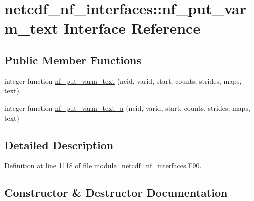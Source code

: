 \hypertarget{interfacenetcdf__nf__interfaces_1_1nf__put__varm__text}{}\section{netcdf\+\_\+nf\+\_\+interfaces\+:\+:nf\+\_\+put\+\_\+varm\+\_\+text Interface Reference}
\label{interfacenetcdf__nf__interfaces_1_1nf__put__varm__text}
\subsection*{Public Member Functions}
\begin{DoxyCompactItemize}
\item 
integer function \hyperlink{interfacenetcdf__nf__interfaces_1_1nf__put__varm__text_a692637529376be417dad47c30d7b1ff2}{nf\+\_\+put\+\_\+varm\+\_\+text} (ncid, varid, start, counts, strides, maps, text)
\item 
integer function \hyperlink{interfacenetcdf__nf__interfaces_1_1nf__put__varm__text_af9cd1922296498b5a8f82eb52f25995a}{nf\+\_\+put\+\_\+varm\+\_\+text\+\_\+a} (ncid, varid, start, counts, strides, maps, text)
\end{DoxyCompactItemize}


\subsection{Detailed Description}


Definition at line 1118 of file module\+\_\+netcdf\+\_\+nf\+\_\+interfaces.\+F90.



\subsection{Constructor \& Destructor Documentation}
\mbox{\label{interfacenetcdf__nf__interfaces_1_1nf__put__varm__text_a692637529376be417dad47c30d7b1ff2}} 
